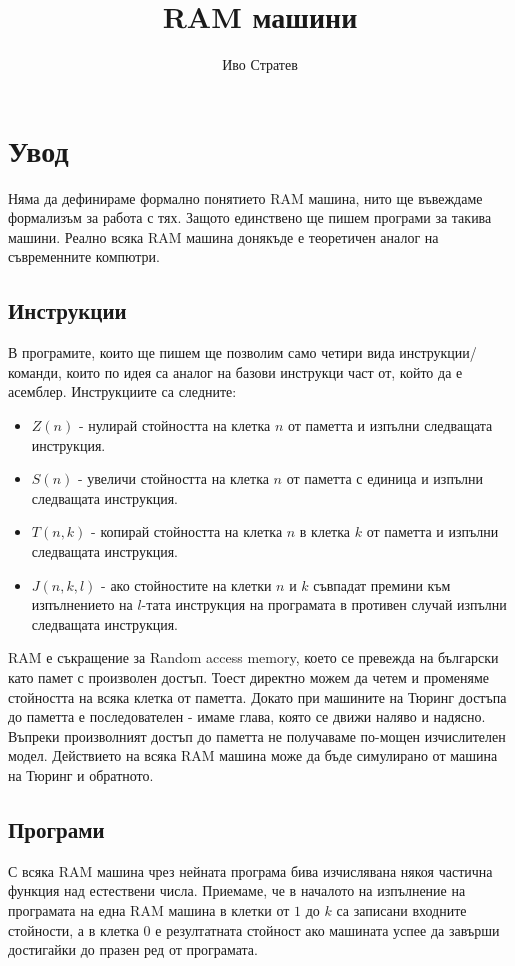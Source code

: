 \documentclass[14pt]{extarticle}
\title{RAM машини}
\author{Иво Стратев}
\begin{document}
\maketitle
\section*{Увод}
Няма да дефинираме формално понятието RAM машина, нито ще въвеждаме формализъм за работа с тях.
Защото единствено ще пишем програми за такива машини. Реално всяка RAM машина донякъде е теоретичен аналог на съвременните компютри.

\subsection*{Инструкции}
В програмите, които ще пишем ще позволим само четири вида инструкции/команди, които по идея са аналог на базови инструкци част от, който да е асемблер.
Инструкциите са следните:
\begin{itemize}
    \item \(Z(n)\) - нулирай стойността на клетка \(n\) от паметта и изпълни следващата инструкция.
    \item \(S(n)\) - увеличи стойността на клетка \(n\) от паметта с единица и изпълни следващата инструкция.
    \item \(T(n, k)\) - копирай стойността на клетка \(n\) в клетка \(k\) от паметта и изпълни следващата инструкция.
    \item \(J(n, k, l)\) - ако стойностите на клетки \(n\) и \(k\) съвпадат премини към изпълнението на \(l\)-тата инструкция на програмата в противен случай изпълни следващата инструкция.
\end{itemize}
RAM е съкращение за Random access memory, което се превежда на български като памет с произволен достъп. Тоест директно можем да четем и променяме стойността на всяка клетка от паметта. Докато при машините на Тюринг достъпа до паметта е последователен - имаме глава, която се движи наляво и надясно.
Въпреки произволният достъп до паметта не получаваме по-мощен изчислителен модел. Действието на всяка RAM машина може да бъде симулирано от машина на Тюринг и обратното.
\subsection*{Програми}
С всяка RAM машина чрез нейната програма бива изчислявана някоя частична функция над естествени числа.
Приемаме, че в началото на изпълнение на програмата на една RAM машина в клетки от \(1\) до \(k\) са записани входните стойности,
а в клетка \(0\) е резултатната стойност ако машината успее да завърши достигайки до празен ред от програмата.
\end{document}
